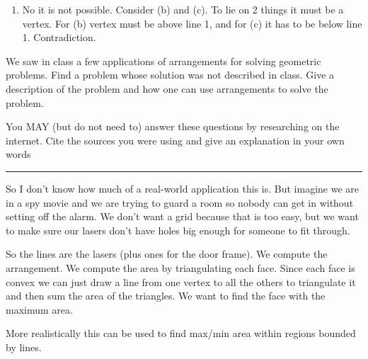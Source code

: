 \documentclass[11pt]{article}
\begin{document}
\begin{enumerate}
\begin{enumerate}
    \end{enumerate}

    \item No it is not possible. Consider (b) and (c). To lie on 2 things it must be a vertex.
    For (b) vertex must be above line 1, and for (c) it has to be below line 1. Contradiction.
\end{enumerate}









We saw in class a few applications of arrangements for solving geometric
problems. Find a problem whose solution was not described in class.  Give a
description of the problem and how one can use arrangements to solve the
problem.

You MAY (but do not need to) answer these questions by researching on the
internet. Cite the sources you were using and give an explanation in your own
words

\hrule


So I don't know how much of a real-world application this is. But imagine we are in a spy movie
and we are trying to guard a room so nobody can get in without setting off the alarm. 
We don't want a grid because that is too easy, but we want to make sure our lasers
don't have holes big enough for someone to fit through. 

So the lines are the lasers (plus ones for the door frame). We compute the arrangement. We compute the area by triangulating each face.
Since each face is convex we can just draw a line from one vertex to all the others to triangulate it
and then sum the area of the triangles. We want to find the face with the maximum area. 

More realistically this can be used to find max/min area within regions bounded by lines. 
\end{document}
